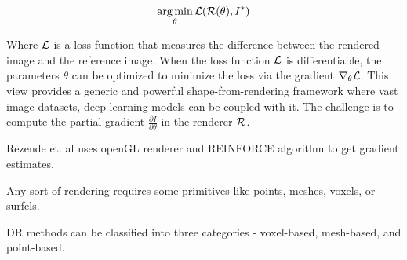 \documentclass[a4paper, 11pt, twocolumn]{article}
\begin{document}
$$
\operatorname*{arg\,min}_{\theta} \mbox{${\cal L}$}(\mbox{${\cal R}$}(\theta), I^*)
$$

Where $\mbox{${\cal L}$}$ is a loss function that measures the difference between the rendered image and the reference image. When the loss function $\mbox{${\cal L}$}$ is differentiable, the parameters $\theta$ can be optimized to minimize the loss via the gradient $\nabla_{\theta}\mbox{${\cal L}$}$. This view provides a generic and powerful shape-from-rendering framework where vast image datasets, deep learning models can be coupled with it. The challenge is to compute the partial gradient $\frac{\partial I}{\partial \theta}$ in the renderer $\mbox{${\cal R}$}$.

Rezende et. al uses openGL renderer and REINFORCE algorithm to get gradient estimates.

Any sort of rendering requires some primitives like points, meshes, voxels, or surfels.

DR methods can be classified into three categories - voxel-based, mesh-based, and point-based.
\nocite{*}


\end{document}
